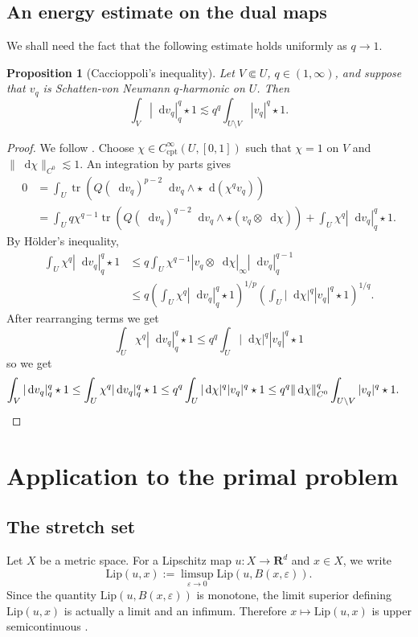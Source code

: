\documentclass[reqno,11pt]{amsart}
\newcommand{\RR}{\mathbf{R}}
\newcommand*\dif{\mathop{}\!\mathrm{d}}
\DeclareMathOperator{\tr}{tr}
\newcommand{\Lip}{\mathrm{Lip}}
\newcommand{\cpt}{\mathrm{cpt}}
\newtheorem{proposition}[theorem]{Proposition}
\theoremstyle{definition}
\numberwithin{equation}{section}
\begin{document}
\subsection{An energy estimate on the dual maps}
We shall need the fact that the following estimate holds uniformly as $q \to 1$.

\begin{proposition}[Caccioppoli's inequality]\label{Caccioppoli}
Let $V \Subset U$, $q \in (1, \infty)$, and suppose that $v_q$ is Schatten-von Neumann $q$-harmonic on $U$.
Then
$$\int_V |\dif v_q|_{q}^q \star 1 \lesssim q^q \int_{U \setminus V} |v_q|^q \star 1.$$
\end{proposition}
\begin{proof}
We follow \cite[Theorem 11.20]{kinnunen2021maximal}.
Choose $\chi \in C^\infty_\cpt(U, [0, 1])$ such that $\chi = 1$ on $V$ and $\|\dif \chi\|_{C^0} \lesssim 1$.
An integration by parts gives
\begin{align*}
0 &= \int_U \tr(Q(\dif v_q)^{p - 2} \dif v_q \wedge \star \dif (\chi^q v_q)) \\
&= \int_U q\chi^{q - 1} \tr(Q(\dif v_q)^{q - 2} \dif v_q \wedge \star (v_q \otimes \dif \chi)) + \int_U \chi^q |\dif v_q|_{q}^q \star 1.
\end{align*}
By H\"older's inequality,
\begin{align*}
\int_U \chi^q |\dif v_q|_{q}^q \star 1
&\leq q \int_U \chi^{q - 1} |v_q \otimes \dif \chi|_{\infty} |\dif v_q|_{q}^{q - 1} \\
&\leq q \left(\int_U \chi^q |\dif v_q|_{q}^q \star 1\right)^{1/p} \left(\int_U |\dif \chi|^q |v_q|^q \star 1\right)^{1/q}.
\end{align*}
After rearranging terms we get 
$$\int_U \chi^q |\dif v_q|_{q}^q \star 1 \leq q^q \int_U |\dif \chi|^q |v_q|^q \star 1$$
so we get 
\begin{align*}
\int_V |\dif v_q|_{q}^q \star 1 &\leq \int_U \chi^q |\dif v_q|_{q}^q \star 1 \leq q^q \int_U |\dif \chi|^q |v_q|^q \star 1
\leq q^q \|\dif \chi\|_{C^0}^q \int_{U \setminus V} |v_q|^q \star 1. \qedhere 
\end{align*}
\end{proof}

\section{Application to the primal problem}
\subsection{The stretch set}
Let $X$ be a metric space.
For a Lipschitz map $u: X \to \RR^d$ and $x \in X$, we write 
$$\Lip(u, x) := \limsup_{\varepsilon \to 0} \Lip(u, B(x, \varepsilon)).$$
Since the quantity $\Lip(u, B(x, \varepsilon))$ is monotone, the limit superior defining $\Lip(u, x)$ is actually a limit and an infimum.
Therefore $x \mapsto \Lip(u, x)$ is upper semicontinuous \cite[Lemma 4.2]{Crandall2008}.
\end{document}
